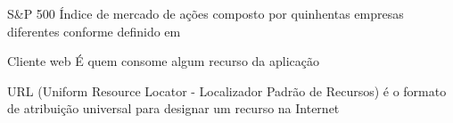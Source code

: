\begin{siglas}
    \item[S\&P 500] Índice de mercado de ações composto por
                    quinhentas empresas diferentes conforme definido
                    em 

    \item[Cliente web] É quem consome algum recurso da aplicação
    
    \item[URL ](Uniform Resource Locator - Localizador Padrão de Recursos) 
    é o formato de atribuição universal para designar um recurso na Internet
\end{siglas}
